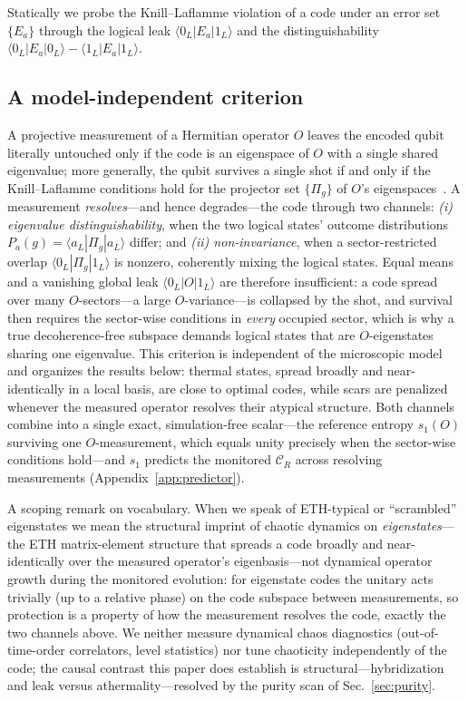 \documentclass[a4paper,11pt,twocolumn,unpublished]{quantumarticle}
\newcommand{\CR}{\mathcal{C}_R}
\begin{document}
Statically we probe the Knill--Laflamme violation of a code under an error set
$\{E_a\}$ through the logical leak $\langle 0_L|E_a|1_L\rangle$ and the
distinguishability $\langle0_L|E_a|0_L\rangle-\langle1_L|E_a|1_L\rangle$.

\subsection{A model-independent criterion}
\label{sec:criterion}
A projective measurement of a Hermitian operator $O$ leaves the encoded qubit
literally untouched only if the code is an eigenspace of $O$ with a single
shared eigenvalue; more generally, the qubit survives a single shot if and only
if the Knill--Laflamme conditions hold for the projector set $\{\Pi_g\}$ of
$O$'s eigenspaces~\cite{KnillLaflamme1997}. A measurement \emph{resolves}---and
hence degrades---the code through two channels: \emph{(i) eigenvalue
distinguishability}, when the two logical states' outcome distributions
$P_a(g)=\langle a_L|\Pi_g|a_L\rangle$ differ; and \emph{(ii) non-invariance},
when a sector-restricted overlap $\langle0_L|\Pi_g|1_L\rangle$ is nonzero,
coherently mixing the logical states. Equal means and a vanishing global leak
$\langle0_L|O|1_L\rangle$ are therefore insufficient: a code spread over many
$O$-sectors---a large $O$-variance---is collapsed by the shot, and survival then
requires the sector-wise conditions in \emph{every} occupied sector, which is
why a true decoherence-free subspace demands logical states that are
$O$-eigenstates sharing one eigenvalue. This criterion is independent of the
microscopic model and organizes the results below: thermal states, spread
broadly and near-identically in a local basis, are close to optimal codes,
while scars are penalized whenever the measured operator resolves their
atypical structure. Both channels combine into a single exact, simulation-free
scalar---the reference entropy $s_1(O)$ surviving one $O$-measurement, which
equals unity precisely when the sector-wise conditions hold---and $s_1$
predicts the monitored $\CR$ across resolving measurements
(Appendix~\ref{app:predictor}).

A scoping remark on vocabulary. When we speak of ETH-typical or
``scrambled'' eigenstates we mean the structural imprint of chaotic dynamics
on \emph{eigenstates}---the ETH
matrix-element structure that spreads a code broadly and near-identically
over the measured operator's eigenbasis---not dynamical operator growth
during the monitored evolution: for eigenstate codes the unitary acts
trivially (up to a relative phase) on the code subspace between measurements,
so protection is a property of how the measurement resolves the code, exactly
the two channels above. We neither measure dynamical chaos diagnostics
(out-of-time-order correlators, level statistics) nor tune chaoticity
independently of the code; the causal contrast this paper does establish is
structural---hybridization and leak versus athermality---resolved by the
purity scan of Sec.~\ref{sec:purity}.
\end{document}

